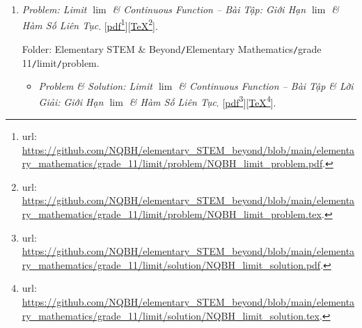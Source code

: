 \documentclass[12pt,oneside]{book}
\begin{document}
\begin{enumerate}
	Folder: {\sf Elementary STEM \& Beyond{\tt/}Elementary Mathematics{\tt/}grade 11{\tt/}progression{\tt/}problem}.
	\begin{itemize}
		\item {\it Problem \& Solution: Arithmetic \& Geometric Progressions -- Bài Tập \& Lời Giải: Cấp Số Cộng \& Cấp Số Nhân}. [\href{https://github.com/NQBH/elementary_STEM_beyond/blob/main/elementary_mathematics/grade_11/progression/solution/NQBH_progression_solution.pdf}{pdf}\footnote{{\sc url}: \url{https://github.com/NQBH/elementary_STEM_beyond/blob/main/elementary_mathematics/grade_11/progression/solution/NQBH_progression_solution.pdf}.}][\href{https://github.com/NQBH/elementary_STEM_beyond/blob/main/elementary_mathematics/grade_11/progression/solution/NQBH_progression_solution.tex}{\TeX}\footnote{{\sc url}: \url{https://github.com/NQBH/elementary_STEM_beyond/blob/main/elementary_mathematics/grade_11/progression/solution/NQBH_progression_solution.tex}.}].
		
		Folder: {\sf Elementary STEM \& Beyond{\tt/}Elementary Mathematics{\tt/}grade 11{\tt/}progression{\tt/}solution}.
	\end{itemize}
	\item {\it Problem: Limit $\lim$ \& Continuous Function -- Bài Tập: Giới Hạn $\lim$ \& Hàm Số Liên Tục}. [\href{https://github.com/NQBH/elementary_STEM_beyond/blob/main/elementary_mathematics/grade_11/limit/problem/NQBH_limit_problem.pdf}{pdf}\footnote{{\sc url}: \url{https://github.com/NQBH/elementary_STEM_beyond/blob/main/elementary_mathematics/grade_11/limit/problem/NQBH_limit_problem.pdf}.}][\href{https://github.com/NQBH/elementary_STEM_beyond/blob/main/elementary_mathematics/grade_11/limit/problem/NQBH_limit_problem.tex}{\TeX}\footnote{{\sc url}: \url{https://github.com/NQBH/elementary_STEM_beyond/blob/main/elementary_mathematics/grade_11/limit/problem/NQBH_limit_problem.tex}.}].
	
	Folder: {\sf Elementary STEM \& Beyond{\tt/}Elementary Mathematics{\tt/}grade 11{\tt/}limit{\tt/}problem}.
	\begin{itemize}
		\item {\it Problem \& Solution: Limit $\lim$ \& Continuous Function -- Bài Tập \& Lời Giải: Giới Hạn $\lim$ \& Hàm Số Liên Tục}. [\href{https://github.com/NQBH/elementary_STEM_beyond/blob/main/elementary_mathematics/grade_11/limit/solution/NQBH_limit_solution.pdf}{pdf}\footnote{{\sc url}: \url{https://github.com/NQBH/elementary_STEM_beyond/blob/main/elementary_mathematics/grade_11/limit/solution/NQBH_limit_solution.pdf}.}][\href{https://github.com/NQBH/elementary_STEM_beyond/blob/main/elementary_mathematics/grade_11/limit/solution/NQBH_limit_solution.tex}{\TeX}\footnote{{\sc url}: \url{https://github.com/NQBH/elementary_STEM_beyond/blob/main/elementary_mathematics/grade_11/limit/solution/NQBH_limit_solution.tex}.}].
		

\end{itemize}
\end{enumerate}
\end{document}
